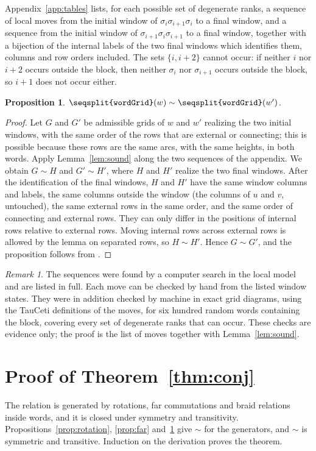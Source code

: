 \documentclass[11pt]{amsart}
\newtheorem{proposition}[theorem]{Proposition}
\theoremstyle{definition}
\theoremstyle{remark}
\newtheorem{remark}[theorem]{Remark}
\newcommand{\lean}[1]{\texttt{\seqsplit{#1}}}
\newcommand{\Mov}{\mathrel{\sim}}
\begin{document}
Appendix~\ref{app:tables} lists, for each possible set of degenerate ranks, a sequence of local moves
from the initial window of $\sigma_i\sigma_{i+1}\sigma_i$ to a final window, and a sequence from the
initial window of $\sigma_{i+1}\sigma_i\sigma_{i+1}$ to a final window, together with a bijection of the
internal labels of the two final windows which identifies them, columns and row orders included. The sets
$\{i,i+2\}$ cannot occur: if neither $i$ nor $i+2$ occurs outside the block, then neither $\sigma_i$ nor
$\sigma_{i+1}$ occurs outside the block, so $i+1$ does not occur either.

\begin{proposition}\label{prop:braid}
$\lean{wordGrid}(w)\Mov\lean{wordGrid}(w')$.
\end{proposition}

\begin{proof}
Let $G$ and $G'$ be admissible grids of $w$ and $w'$ realizing the two initial windows, with the same
order of the rows that are external or connecting; this is possible because these rows are the same
arcs, with the same heights, in both words. Apply Lemma~\ref{lem:sound} along the two sequences of the
appendix. We obtain $G\Mov H$ and $G'\Mov H'$, where $H$ and $H'$ realize the two final windows. After
the identification of the final windows, $H$ and $H'$ have the same window columns and labels, the same
columns outside the window (the columns of $u$ and $v$, untouched), the same external rows in the same
order, and the same order of connecting and external rows. They can only differ in the positions of
internal rows relative to external rows. Moving internal rows across external rows is allowed by the
lemma on separated rows, so $H\Mov H'$. Hence $G\Mov G'$, and the proposition follows from
\lean{IsAdmissibleWordGrid.movesTo}.
\end{proof}

\begin{remark}
The sequences were found by a computer search in the local model and are listed in full. Each move can
be checked by hand from the listed window states. They were in addition checked by machine in exact
grid diagrams, using the TauCeti definitions of the moves, for six hundred random words containing the
block, covering every set of degenerate ranks that can occur. These checks are evidence only; the proof
is the list of moves together with Lemma~\ref{lem:sound}.
\end{remark}

\section{Proof of Theorem~\ref{thm:conj}}
The relation \lean{PositiveWordConj} is generated by rotations, far commutations and braid relations
inside words, and it is closed under symmetry and transitivity. Propositions~\ref{prop:rotation},
\ref{prop:far} and~\ref{prop:braid} give $\Mov$ for the generators, and $\Mov$ is symmetric and
transitive. Induction on the derivation proves the theorem.
\end{document}
